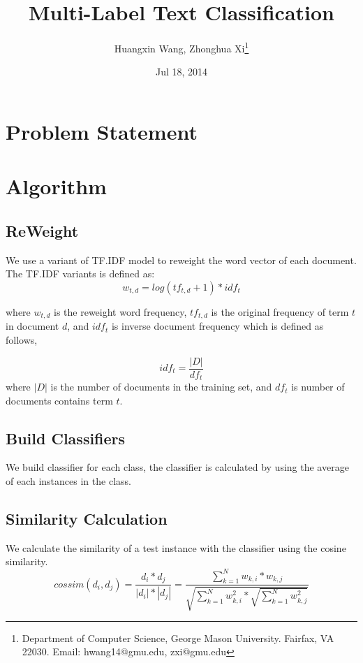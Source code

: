 \documentclass{article}%
\begin{document}
\title{Multi-Label Text Classification}
\date{Jul 18, 2014}
\author{Huangxin Wang, Zhonghua Xi\thanks{Department of Computer Science, George Mason University. Fairfax, VA 22030. Email: \textsf{hwang14@gmu.edu, zxi@gmu.edu}}}

\maketitle

\section{Problem Statement}

\section{Algorithm}
\subsection{ReWeight} We use a variant of TF.IDF model to reweight the word vector of  each document. The TF.IDF variants is defined as:
\begin{displaymath}
w_{t,d} = log(tf_{t,d}+1)*idf_t
\end{displaymath}

where $w_{t,d}$ is the reweight word frequency, $tf_{t,d}$ is the original frequency of term $t$ in document $d$, and $idf_t$ is inverse document frequency which is defined as follows,

\begin{displaymath}
idf_t = \frac{|D|}{df_t}
\end{displaymath}
where $|D|$ is the number of documents in the training set, and $df_t$ is number of documents contains  term $t$.

\subsection{Build Classifiers}
We build classifier for each class, the classifier is calculated by using the average of each instances in the class.

\subsection{Similarity Calculation}
We calculate the similarity of a test instance with the classifier using the cosine similarity.
\begin{displaymath}
cossim(d_i,d_j) = \frac{d_i*d_j}{|d_i|*|d_j|} = \frac{\sum^N_{k=1} w_{k,i}*w_{k,j}}{\sqrt{\sum^N_{k=1} w^2_{k,i}*\sqrt{\sum^N_{k=1}w^2_{k,j}}}}
\end{displaymath}
\end{document}
